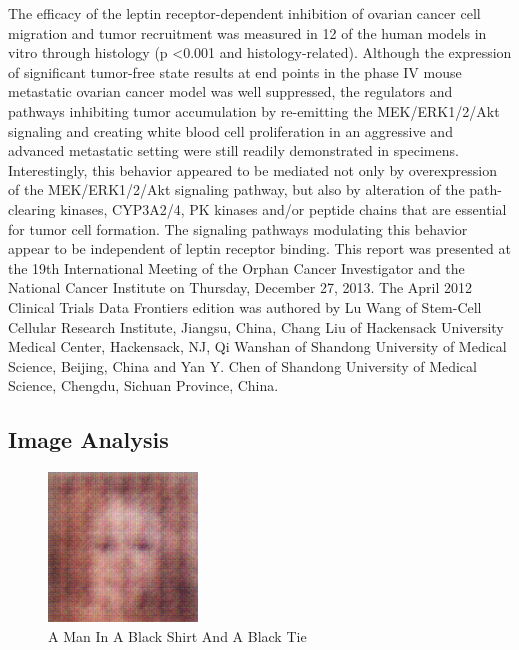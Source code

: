 \documentclass{article}%
\begin{document}
The efficacy of the leptin receptor{-}dependent inhibition of ovarian cancer cell migration and tumor recruitment was measured in 12 of the human models in vitro through histology (p <0.001 and histology{-}related). Although the expression of significant tumor{-}free state results at end points in the phase IV mouse metastatic ovarian cancer model was well suppressed, the regulators and pathways inhibiting tumor accumulation by re{-}emitting the MEK/ERK1/2/Akt signaling and creating white blood cell proliferation in an aggressive and advanced metastatic setting were still readily demonstrated in specimens. Interestingly, this behavior appeared to be mediated not only by overexpression of the MEK/ERK1/2/Akt signaling pathway, but also by alteration of the path{-}clearing kinases, CYP3A2/4, PK kinases and/or peptide chains that are essential for tumor cell formation. The signaling pathways modulating this behavior appear to be independent of leptin receptor binding.\newline%
This report was presented at the 19th International Meeting of the Orphan Cancer Investigator and the National Cancer Institute on Thursday, December 27, 2013. The April 2012 Clinical Trials Data Frontiers edition was authored by Lu Wang of Stem{-}Cell Cellular Research Institute, Jiangsu, China, Chang Liu of Hackensack University Medical Center, Hackensack, NJ, Qi Wanshan of Shandong University of Medical Science, Beijing, China and Yan Y. Chen of Shandong University of Medical Science, Chengdu, Sichuan Province, China.

%
\subsection{Image Analysis}%
\label{subsec:ImageAnalysis}%


\begin{figure}[h!]%
\centering%
\includegraphics[width=150px]{500_fake_images/samples_5_47.png}%
\caption{A Man In A Black Shirt And A Black Tie}%
\end{figure}

%
\end{document}
